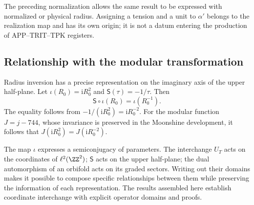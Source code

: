 The preceding normalization allows the same result to be expressed with
normalized or physical radius. Assigning a tension and a
unit to \(\alpha'\) belongs to the realization map and has
its own origin; it is not a datum entering the production
of APP--TRIT--TPK registers.

\subsection{Relationship with the modular transformation}

Radius inversion has a precise representation on the
imaginary axis of the upper half-plane. Let
\(\iota(R_0)=\mathrm iR_0^2\) and
\(\mathsf S(\tau)=-1/\tau\). Then
\begin{equation}
 \mathsf S\circ\iota(R_0)=\iota(R_0^{-1}).
 \label{x_reciprocidad:iv:eq:semiconjugacion-modular}
\end{equation}
The equality follows from
\(-1/(\mathrm iR_0^2)=\mathrm iR_0^{-2}\). For the modular
function \(J=j-744\), whose invariance is preserved in the
Moonshine development, it follows that
\(J(\mathrm iR_0^2)=J(\mathrm iR_0^{-2})\).

The map \(\iota\) expresses a semiconjugacy of parameters.
The interchange \(U_T\) acts on the coordinates of
\(\ell^2(\ZZ^2)\); \(\mathsf S\) acts on the upper
half-plane; the dual automorphism of an orbifold acts on its
graded sectors. Writing out their domains makes it possible to
compose specific relationships between them while preserving the
information of each representation. The results assembled here
establish coordinate interchange with explicit
operator domains and proofs.
